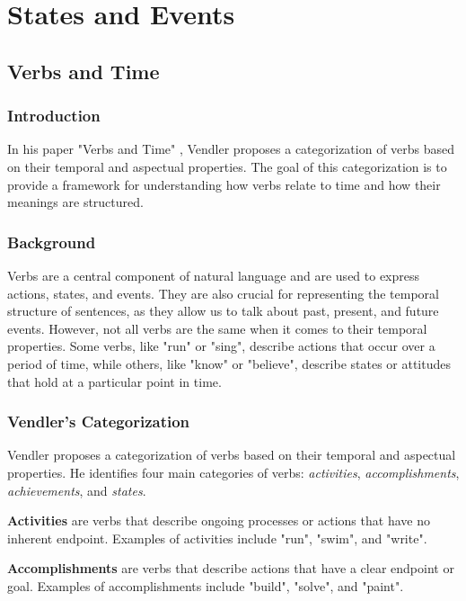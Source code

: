 \chapter{States and Events}
\section{Verbs and Time}
\subsection{Introduction}

In his paper "Verbs and Time" \cite{vendler1957verbs}, Vendler proposes a categorization of verbs based on their temporal and aspectual properties. The goal of this categorization is to provide a framework for understanding how verbs relate to time and how their meanings are structured.

\subsection{Background}

Verbs are a central component of natural language and are used to express actions, states, and events. They are also crucial for representing the temporal structure of sentences, as they allow us to talk about past, present, and future events. However, not all verbs are the same when it comes to their temporal properties. Some verbs, like "run" or "sing", describe actions that occur over a period of time, while others, like "know" or "believe", describe states or attitudes that hold at a particular point in time.

\subsection{Vendler's Categorization}

Vendler proposes a categorization of verbs based on their temporal and aspectual properties. He identifies four main categories of verbs: \textit{activities}, \textit{accomplishments}, \textit{achievements}, and \textit{states}.

\textbf{Activities} are verbs that describe ongoing processes or actions that have no inherent endpoint. Examples of activities include "run", "swim", and "write".


\textbf{Accomplishments} are verbs that describe actions that have a clear endpoint or goal. Examples of accomplishments include "build", "solve", and "paint".


